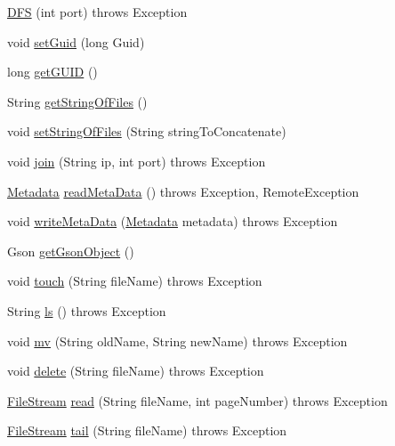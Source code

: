 \begin{DoxyCompactItemize}
\item 
\mbox{\hyperlink{class_d_f_s_ad863806217afcce82e64f5d7d4c124ad}{D\+FS}} (int port)  throws Exception     
\item 
void \mbox{\hyperlink{class_d_f_s_a2b7fc8baa8a13aef60da87bde16eb0b3}{set\+Guid}} (long Guid)
\item 
long \mbox{\hyperlink{class_d_f_s_a95f46c984fa3cdd15c03e60c43e54eac}{get\+G\+U\+ID}} ()
\item 
String \mbox{\hyperlink{class_d_f_s_a7024a402890d96dc2cbbc05645a869c8}{get\+String\+Of\+Files}} ()
\item 
void \mbox{\hyperlink{class_d_f_s_a0b41c089ddb9531824556a982e3548eb}{set\+String\+Of\+Files}} (String string\+To\+Concatenate)
\item 
void \mbox{\hyperlink{class_d_f_s_a21222612b26b908c380b73e1e5912a03}{join}} (String ip, int port)  throws Exception 
\item 
\mbox{\hyperlink{class_metadata}{Metadata}} \mbox{\hyperlink{class_d_f_s_a05df5c4a73e10460c29b14b46642eb8a}{read\+Meta\+Data}} ()  throws Exception, Remote\+Exception 
\item 
void \mbox{\hyperlink{class_d_f_s_a2fceb11bdd1e270a4aabcbf9c0dd4339}{write\+Meta\+Data}} (\mbox{\hyperlink{class_metadata}{Metadata}} metadata)  throws Exception 
\item 
Gson \mbox{\hyperlink{class_d_f_s_abdcb090af2467b8a2cfe9ab55b3d9cea}{get\+Gson\+Object}} ()
\item 
void \mbox{\hyperlink{class_d_f_s_ac44bf8288f4423fc87370b97f95f07c1}{touch}} (String file\+Name)  throws Exception 
\item 
String \mbox{\hyperlink{class_d_f_s_a753e09aab8e500f333585f1a6ee865e1}{ls}} ()  throws Exception 
\item 
void \mbox{\hyperlink{class_d_f_s_a7b0d44e11c6176a71d040919b6fe1d96}{mv}} (String old\+Name, String new\+Name)  throws Exception 
\item 
void \mbox{\hyperlink{class_d_f_s_afa4df78a9af4f942cd878afc329b98e1}{delete}} (String file\+Name)  throws Exception 
\item 
\mbox{\hyperlink{class_file_stream}{File\+Stream}} \mbox{\hyperlink{class_d_f_s_a2fe4f98b6e0dede1c97d67bbb5c77df1}{read}} (String file\+Name, int page\+Number)  throws Exception 
\item 
\mbox{\hyperlink{class_file_stream}{File\+Stream}} \mbox{\hyperlink{class_d_f_s_a86ed64f3b14dc0c0d878dbcb1ca1cfa9}{tail}} (String file\+Name)  throws Exception     

\end{DoxyCompactItemize}
